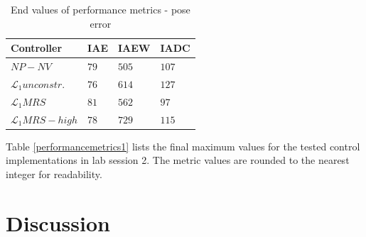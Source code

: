 \begin{table}[h!]
\centering 
\begin{tabular}{| p{2cm} | p{2cm} | p{3cm} | p{2cm}|}
\hline
\textbf{Controller}& \textbf{IAE} &  \textbf{IAEW} &\textbf{IADC}   \\ \hline\hline
$NP-NV$ & $79$ & $505$ & $107$  \\ \hline
$\mathcal{L}_1 unconstr.$ & $76$ & $614$ & $127$  \\ \hline
$\mathcal{L}_1 MRS$ & $81$ & $562$ & $97$  \\ \hline
$\mathcal{L}_1 MRS-high$ & $78$ & $729$ & $115$  \\ \hline

\end{tabular}
\caption{End values of performance metrics - pose error}
\label{performancemetrics2}
\end{table}
Table \ref{performancemetrics1} lists the final maximum values for the tested control implementations in lab session 2. The metric values are rounded to the nearest integer for readability.


\section{Discussion}

\cleardoublepage